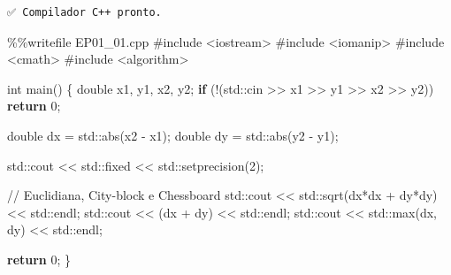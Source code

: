 \documentclass[
  portuguese,
  letterpaper,
  openany,
  oneside,
  12pt,
  a4paper]{book}
\newenvironment{Shaded}{\begin{snugshade}}{\end{snugshade}}
\newcommand{\BuiltInTok}[1]{\textcolor[rgb]{0.00,0.23,0.31}{#1}}
\newcommand{\CommentTok}[1]{\textcolor[rgb]{0.37,0.37,0.37}{#1}}
\newcommand{\ControlFlowTok}[1]{\textcolor[rgb]{0.00,0.23,0.31}{\textbf{#1}}}
\newcommand{\DecValTok}[1]{\textcolor[rgb]{0.68,0.00,0.00}{#1}}
\newcommand{\NormalTok}[1]{\textcolor[rgb]{0.00,0.23,0.31}{#1}}
\newcommand{\OperatorTok}[1]{\textcolor[rgb]{0.37,0.37,0.37}{#1}}
\begin{document}
\begin{verbatim}
✅ Compilador C++ pronto.
\end{verbatim}

\begin{Shaded}
\begin{Highlighting}[]
\OperatorTok{\%\%}\NormalTok{writefile EP01\_01.cpp}
\CommentTok{\#include \textless{}iostream\textgreater{}}
\CommentTok{\#include \textless{}iomanip\textgreater{}}
\CommentTok{\#include \textless{}cmath\textgreater{}}
\CommentTok{\#include \textless{}algorithm\textgreater{}}

\BuiltInTok{int}\NormalTok{ main() \{}
\NormalTok{    double x1, y1, x2, y2}\OperatorTok{;}
    \ControlFlowTok{if}\NormalTok{ (}\OperatorTok{!}\NormalTok{(std::cin }\OperatorTok{\textgreater{}\textgreater{}}\NormalTok{ x1 }\OperatorTok{\textgreater{}\textgreater{}}\NormalTok{ y1 }\OperatorTok{\textgreater{}\textgreater{}}\NormalTok{ x2 }\OperatorTok{\textgreater{}\textgreater{}}\NormalTok{ y2)) }\ControlFlowTok{return} \DecValTok{0}\OperatorTok{;}

\NormalTok{    double dx }\OperatorTok{=}\NormalTok{ std::}\BuiltInTok{abs}\NormalTok{(x2 }\OperatorTok{{-}}\NormalTok{ x1)}\OperatorTok{;}
\NormalTok{    double dy }\OperatorTok{=}\NormalTok{ std::}\BuiltInTok{abs}\NormalTok{(y2 }\OperatorTok{{-}}\NormalTok{ y1)}\OperatorTok{;}

\NormalTok{    std::cout }\OperatorTok{\textless{}\textless{}}\NormalTok{ std::fixed }\OperatorTok{\textless{}\textless{}}\NormalTok{ std::setprecision(}\DecValTok{2}\NormalTok{)}\OperatorTok{;}
    
    \OperatorTok{//}\NormalTok{ Euclidiana, City}\OperatorTok{{-}}\NormalTok{block e Chessboard}
\NormalTok{    std::cout }\OperatorTok{\textless{}\textless{}}\NormalTok{ std::sqrt(dx}\OperatorTok{*}\NormalTok{dx }\OperatorTok{+}\NormalTok{ dy}\OperatorTok{*}\NormalTok{dy) }\OperatorTok{\textless{}\textless{}}\NormalTok{ std::endl}\OperatorTok{;}
\NormalTok{    std::cout }\OperatorTok{\textless{}\textless{}}\NormalTok{ (dx }\OperatorTok{+}\NormalTok{ dy) }\OperatorTok{\textless{}\textless{}}\NormalTok{ std::endl}\OperatorTok{;}
\NormalTok{    std::cout }\OperatorTok{\textless{}\textless{}}\NormalTok{ std::}\BuiltInTok{max}\NormalTok{(dx, dy) }\OperatorTok{\textless{}\textless{}}\NormalTok{ std::endl}\OperatorTok{;}

    \ControlFlowTok{return} \DecValTok{0}\OperatorTok{;}
\NormalTok{\}}
\end{Highlighting}
\end{Shaded}
\end{document}
